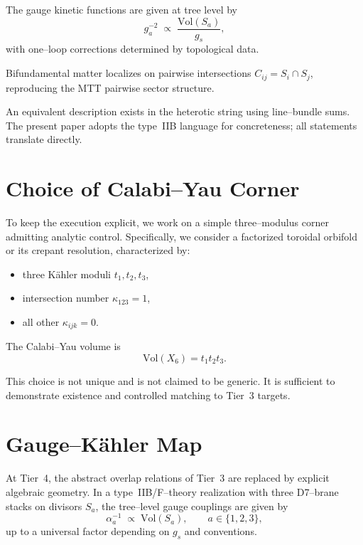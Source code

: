 \documentclass[11pt]{article}
\begin{document}
The gauge kinetic functions are given at tree level by
\begin{equation}
g_a^{-2} \;\propto\; \frac{\mathrm{Vol}(S_a)}{g_s},
\label{eq:IIB-gauge}
\end{equation}
with one--loop corrections determined by topological data.

Bifundamental matter localizes on pairwise intersections
$C_{ij}=S_i\cap S_j$, reproducing the MTT pairwise sector structure.

\begin{remark}
An equivalent description exists in the heterotic string using
line--bundle sums.
The present paper adopts the type~IIB language for concreteness; all
statements translate directly.
\end{remark}

\section{Choice of Calabi--Yau Corner}

To keep the execution explicit, we work on a simple three--modulus
corner admitting analytic control.
Specifically, we consider a factorized toroidal orbifold or its crepant
resolution, characterized by:
\begin{itemize}
  \item three K\"ahler moduli $t_1,t_2,t_3$,
  \item intersection number $\kappa_{123}=1$,
  \item all other $\kappa_{ijk}=0$.
\end{itemize}

The Calabi--Yau volume is
\begin{equation}
\mathrm{Vol}(X_6)=t_1 t_2 t_3 .
\label{eq:CY-volume}
\end{equation}

This choice is not unique and is not claimed to be generic.
It is sufficient to demonstrate existence and controlled matching to
Tier~3 targets.

\section{Gauge--K\"ahler Map}

At Tier~4, the abstract overlap relations of Tier~3 are replaced by
explicit algebraic geometry.
In a type~IIB/F--theory realization with three D7--brane stacks on
divisors $S_a$, the tree--level gauge couplings are given by
\begin{equation}
\alpha_a^{-1}
\;\propto\;
\mathrm{Vol}(S_a),
\qquad a \in \{1,2,3\},
\label{eq:gauge-divisor}
\end{equation}
up to a universal factor depending on $g_s$ and conventions.
\end{document}
